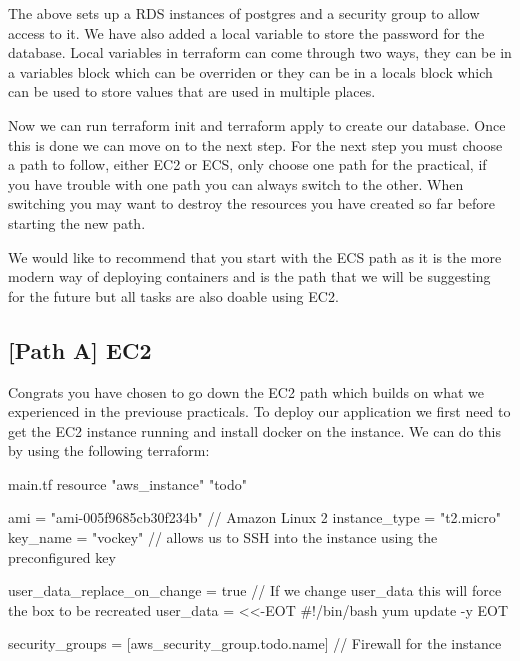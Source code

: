 \documentclass{csse4400}
\begin{document}
The above sets up a RDS instances of postgres and a security group to allow access to it. We have also added a local variable to store the password for the database. Local variables in terraform can come through two ways, they can be in a variables block which can be overriden or they can be in a locals block which can be used to store values that are used in multiple places.

Now we can run terraform init and terraform apply to create our database. Once this is done we can move on to the next step. For the next step you must choose a path to follow, either EC2 or ECS, only choose one path for the practical, if you have trouble with one path you can always switch to the other. When switching you may want to destroy the resources you have created so far before starting the new path.

We would like to recommend that you start with the ECS path as it is the more modern way of deploying containers and is the path that we will be suggesting for the future but all tasks are also doable using EC2.

\subsection{[Path A] EC2}


Congrats you have chosen to go down the EC2 path which builds on what we experienced in the previouse practicals. To deploy our application we first need to get the EC2 instance running and install docker on the instance. We can do this by using the following terraform:

\begin{code}[language=terraform,numbers=none]{main.tf}
  resource "aws_instance" "todo" {
    ami           = "ami-005f9685cb30f234b" // Amazon Linux 2
    instance_type = "t2.micro"
    key_name      = "vockey" // allows us to SSH into the instance using the preconfigured key
    
    user_data_replace_on_change = true // If we change user_data this will force the box to be recreated
    user_data                   = <<-EOT
  #!/bin/bash
  yum update -y
    EOT
  
    security_groups = [aws_security_group.todo.name] // Firewall for the instance
  }
\end{code}
\end{document}
